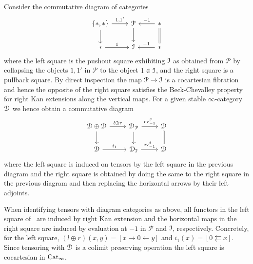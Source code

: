 \begin{construction}
\label{construction:twar}%
Consider the commutative diagram of categories
\begin{equation}
\label{equation:pre-square-I-Q1}%
\begin{tikzcd}
\{\ast, \ast\} \ar[r,"{1,1'}"] \ar[d]  & \mathcal{P} \ar[d] & \ar[l,"-1"'] \ast \ar[d,equal] \\
\ast \ar[r,"1"] & \I & \ar[l,"-1"'] \ast 
\end{tikzcd}
\end{equation}
where the left square is the pushout square exhibiting $\mathcal{I}$ as obtained from $\mathcal{P}$ by collapsing the objects $1,1'$ in $\mathcal{P}$ to the object $1 \in \mathcal{I}$, and the right square is a pullback square. By direct inspection the map $\mathcal{P} \to \mathcal{I}$ is a cocartesian fibration and hence the opposite of the right square satisfies the Beck-Chevalley property for right Kan extensions along the vertical maps. For a given stable $\infty$-category $\mathcal{D}$ we hence obtain a commutative diagram
\begin{equation}
\label{equation:stable-square-I-Q1}%
\begin{tikzcd}
\D \oplus \D \ar[r,"l \oplus r"]\ar[d] & \D_{\mathcal{P}} \ar[d] \ar[r,"\ev^{\cP}_{-1}"] & \D \ar[d,equal] \\
\D \ar[r,"i_1"] & \D_\I \ar[r,"\ev^{\I}_{-1}"] & \D
\end{tikzcd}
\end{equation}
where the left square is induced on tensors by the left square in the previous diagram and the right square is obtained by doing the same to the right square in the previous diagram and then replacing the horizontal arrows by their left adjoints. 
\end{construction}

When identifying tensors with diagram categories as above, all functors in the left square of~ are induced by right Kan extension and the horizontal maps in the right square are induced by evaluation 
at $-1$ in $\mathcal{P}$ and $\mathcal{I}$, respectively. Concretely, for the left square, $(l\oplus r)(x,y) = [x \rightarrow 0 \leftarrow y]$ and $i_1(x) = [0 \leftleftarrows x]$. 
Since tensoring with $\mathcal{D}$ is a colimit preserving operation the left square is cocartesian in $\mathrm{Cat}_\infty$.

